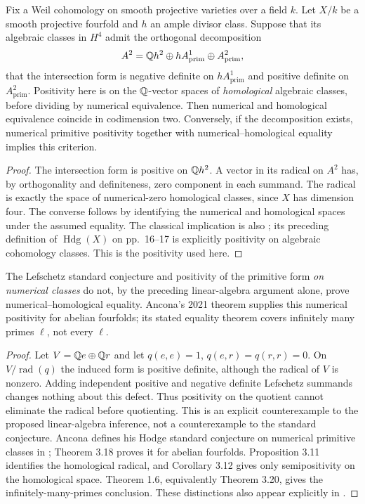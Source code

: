 \begin{proposition}\label{prop:B1b-criterion}
Fix a Weil cohomology on smooth projective varieties over a field $k$.
Let $X/k$ be a smooth projective fourfold and $h$ an ample divisor class.
Suppose that its algebraic classes in $H^4$ admit the orthogonal
decomposition
\[
 A^2={\mathbb{Q}} h^2\oplus hA^1_{\mathrm{prim}}\oplus A^2_{\mathrm{prim}},
\]
that the intersection form is negative definite on
$hA^1_{\mathrm{prim}}$ and positive definite on
$A^2_{\mathrm{prim}}$. Positivity here is on the ${\mathbb{Q}}$-vector spaces of
\emph{homological} algebraic classes, before dividing by numerical
equivalence. Then numerical and homological equivalence coincide in
codimension two. Conversely, if the decomposition exists, numerical
primitive positivity together with numerical--homological equality
implies this criterion.
\end{proposition}
\begin{proof}
The intersection form is positive on ${\mathbb{Q}} h^2$. A vector in its radical
on $A^2$ has, by orthogonality and definiteness, zero component in each
summand. The radical is exactly the space of numerical-zero homological
classes, since $X$ has dimension four. The converse follows by identifying
the numerical and homological spaces under the assumed equality.
The classical implication is also
\cite[Proposition 5-1, p.~17]{BKleiman1994}; its preceding definition
of $\operatorname{Hdg}(X)$ on pp.~16--17 is explicitly positivity
on algebraic cohomology classes. This is the positivity used here.
\end{proof}

\begin{proposition}\label{prop:B1b-gap}
The Lefschetz standard conjecture and positivity of the primitive form
\emph{on numerical classes} do not, by the preceding linear-algebra
argument alone, prove numerical--homological equality. Ancona's 2021
theorem supplies this numerical positivity for abelian fourfolds; its
stated equality theorem covers infinitely many primes $\ell$, not every
$\ell$.
\end{proposition}
\begin{proof}
Let $V={\mathbb{Q}} e\oplus{\ensuremath{\mathbb{Q}}} r$ and let $q(e,e)=1$, $q(e,r)=q(r,r)=0$.
On $V/\operatorname{rad}(q)$ the induced form is positive definite,
although the radical of $V$ is nonzero. Adding independent positive and
negative definite Lefschetz summands changes nothing about this defect.
Thus positivity on the quotient cannot eliminate the radical before
quotienting. This is an explicit counterexample to the proposed
linear-algebra inference, not a counterexample to the standard conjecture.
Ancona defines his Hodge standard conjecture on numerical primitive
classes in \cite[\S3, Conjecture 3.10]{BAncona2021}; Theorem 3.18 proves it
for abelian fourfolds. Proposition 3.11 identifies the homological radical,
and Corollary 3.12 gives only semipositivity on the homological space.
Theorem 1.6, equivalently Theorem 3.20, gives the infinitely-many-primes
conclusion. These distinctions also appear explicitly in
\cite[Remark 1.3]{BBroe2026}.
\end{proof}

